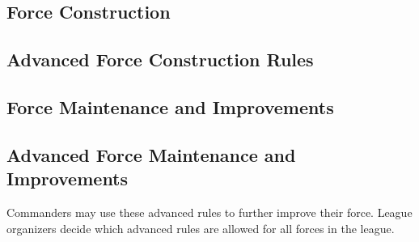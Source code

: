 

\subsection{Force Construction}
\label{subsec:force_construction}



\newpage



\newpage

\subsection{Advanced Force Construction Rules}





\subsection{Force Maintenance and Improvements}
\label{subsec:force_maintenance}



\newpage

\subsection{Advanced Force Maintenance and Improvements}

Commanders may use these advanced rules to further improve their force.
League organizers decide which advanced rules are allowed for all forces in the league.

